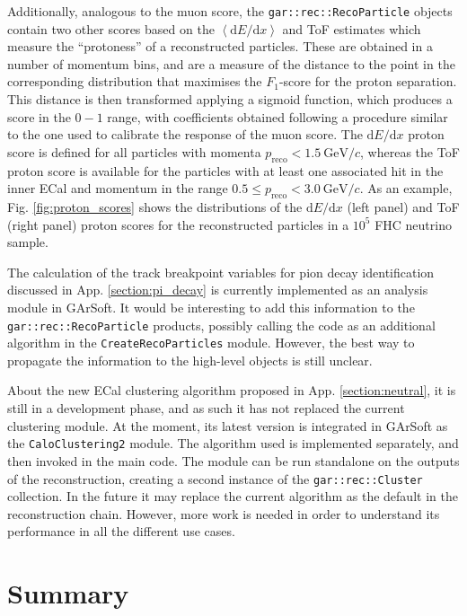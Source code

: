 Additionally, analogous to the muon score, the \texttt{gar::rec::RecoParticle} objects contain two other scores based on the $\left<\mathrm{d}E/\mathrm{d}x\right>$ and ToF estimates which measure the ``protoness'' of a reconstructed particles. These are obtained in a number of momentum bins, and are a measure of the distance to the point in the corresponding distribution that maximises the $F_{1}$-score for the proton separation. This distance is then transformed applying a sigmoid function, which produces a score in the $0-1$ range, with coefficients obtained following a procedure similar to the one used to calibrate the response of the muon score. The $\mathrm{d}E/\mathrm{d}x$ proton score is defined for all particles with momenta $p_{\mathrm{reco}} < 1.5~\mathrm{GeV}/c$, whereas the ToF proton score is available for the particles with at least one associated hit in the inner ECal and momentum in the range $0.5 \leq p_{\mathrm{reco}} < 3.0~\mathrm{GeV}/c$. As an example, Fig. \ref{fig:proton_scores} shows the distributions of the $\mathrm{d}E/\mathrm{d}x$ (left panel) and ToF (right panel) proton scores for the reconstructed particles in a $10^{5}$ FHC neutrino sample.

The calculation of the track breakpoint variables for pion decay identification discussed in App. \ref{section:pi_decay} is currently implemented as an analysis module in GArSoft. It would be interesting to add this information to the \texttt{gar::rec::RecoParticle} products, possibly calling the code as an additional algorithm in the \texttt{CreateRecoParticles} module. However, the best way to propagate the information to the high-level objects is still unclear.

About the new ECal clustering algorithm proposed in App. \ref{section:neutral}, it is still in a development phase, and as such it has not replaced the current clustering module. At the moment, its latest version is integrated in GArSoft as the \texttt{CaloClustering2} module. The algorithm used is implemented separately, and then invoked in the main code. The module can be run standalone on the outputs of the reconstruction, creating a second instance of the \texttt{gar::rec::Cluster} collection. In the future it may replace the current algorithm as the default in the reconstruction chain. However, more work is needed in order to understand its performance in all the different use cases.

\section{Summary}

